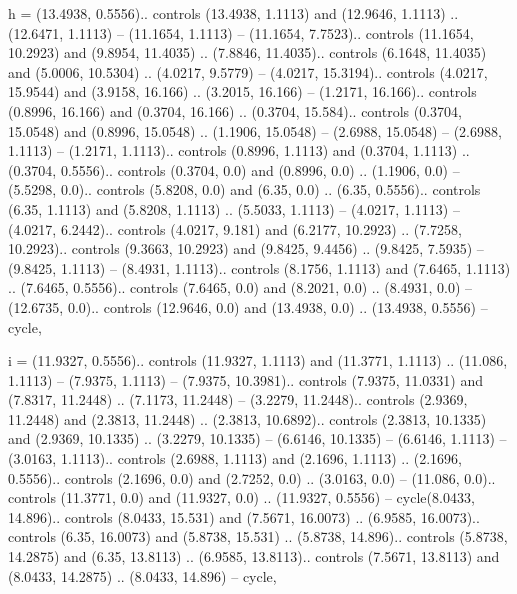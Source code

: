 h = {(13.4938, 0.5556).. controls (13.4938, 1.1113) and (12.9646, 1.1113) .. (12.6471, 1.1113) -- (11.1654, 1.1113) -- (11.1654, 7.7523).. controls (11.1654, 10.2923) and (9.8954, 11.4035) .. (7.8846, 11.4035).. controls (6.1648, 11.4035) and (5.0006, 10.5304) .. (4.0217, 9.5779) -- (4.0217, 15.3194).. controls (4.0217, 15.9544) and (3.9158, 16.166) .. (3.2015, 16.166) -- (1.2171, 16.166).. controls (0.8996, 16.166) and (0.3704, 16.166) .. (0.3704, 15.584).. controls (0.3704, 15.0548) and (0.8996, 15.0548) .. (1.1906, 15.0548) -- (2.6988, 15.0548) -- (2.6988, 1.1113) -- (1.2171, 1.1113).. controls (0.8996, 1.1113) and (0.3704, 1.1113) .. (0.3704, 0.5556).. controls (0.3704, 0.0) and (0.8996, 0.0) .. (1.1906, 0.0) -- (5.5298, 0.0).. controls (5.8208, 0.0) and (6.35, 0.0) .. (6.35, 0.5556).. controls (6.35, 1.1113) and (5.8208, 1.1113) .. (5.5033, 1.1113) -- (4.0217, 1.1113) -- (4.0217, 6.2442).. controls (4.0217, 9.181) and (6.2177, 10.2923) .. (7.7258, 10.2923).. controls (9.3663, 10.2923) and (9.8425, 9.4456) .. (9.8425, 7.5935) -- (9.8425, 1.1113) -- (8.4931, 1.1113).. controls (8.1756, 1.1113) and (7.6465, 1.1113) .. (7.6465, 0.5556).. controls (7.6465, 0.0) and (8.2021, 0.0) .. (8.4931, 0.0) -- (12.6735, 0.0).. controls (12.9646, 0.0) and (13.4938, 0.0) .. (13.4938, 0.5556) -- cycle},

i = {(11.9327, 0.5556).. controls (11.9327, 1.1113) and (11.3771, 1.1113) .. (11.086, 1.1113) -- (7.9375, 1.1113) -- (7.9375, 10.3981).. controls (7.9375, 11.0331) and (7.8317, 11.2448) .. (7.1173, 11.2448) -- (3.2279, 11.2448).. controls (2.9369, 11.2448) and (2.3813, 11.2448) .. (2.3813, 10.6892).. controls (2.3813, 10.1335) and (2.9369, 10.1335) .. (3.2279, 10.1335) -- (6.6146, 10.1335) -- (6.6146, 1.1113) -- (3.0163, 1.1113).. controls (2.6988, 1.1113) and (2.1696, 1.1113) .. (2.1696, 0.5556).. controls (2.1696, 0.0) and (2.7252, 0.0) .. (3.0163, 0.0) -- (11.086, 0.0).. controls (11.3771, 0.0) and (11.9327, 0.0) .. (11.9327, 0.5556) -- cycle(8.0433, 14.896).. controls (8.0433, 15.531) and (7.5671, 16.0073) .. (6.9585, 16.0073).. controls (6.35, 16.0073) and (5.8738, 15.531) .. (5.8738, 14.896).. controls (5.8738, 14.2875) and (6.35, 13.8113) .. (6.9585, 13.8113).. controls (7.5671, 13.8113) and (8.0433, 14.2875) .. (8.0433, 14.896) -- cycle},

